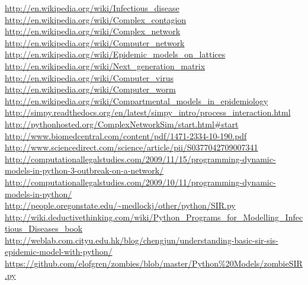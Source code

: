 \documentclass{article}
\begin{document}
\url{http://en.wikipedia.org/wiki/Infectious_disease  }\\
\url{http://en.wikipedia.org/wiki/Complex_contagion   }\\
\url{http://en.wikipedia.org/wiki/Complex_network     }\\
\url{http://en.wikipedia.org/wiki/Computer_network    }\\
\url{http://en.wikipedia.org/wiki/Epidemic_models_on_lattices}\\
\url{http://en.wikipedia.org/wiki/Next_generation_matrix}\\
\url{http://en.wikipedia.org/wiki/Computer_virus}\\
\url{http://en.wikipedia.org/wiki/Computer_worm}\\
\url{http://en.wikipedia.org/wiki/Compartmental_models_in_epidemiology}\\
\url{http://simpy.readthedocs.org/en/latest/simpy_intro/process_interaction.html}\\
\url{http://pythonhosted.org/ComplexNetworkSim/start.html#start}\\
\url{http://www.biomedcentral.com/content/pdf/1471-2334-10-190.pdf}\\
\url{http://www.sciencedirect.com/science/article/pii/S0377042709007341}\\
\url{http://computationallegalstudies.com/2009/11/15/programming-dynamic-models-in-python-3-outbreak-on-a-network/}\\
\url{http://computationallegalstudies.com/2009/10/11/programming-dynamic-models-in-python/}\\
\url{http://people.oregonstate.edu/~medlockj/other/python/SIR.py}\\
\url{http://wiki.deductivethinking.com/wiki/Python_Programs_for_Modelling_Infectious_Diseases_book}\\
\url{http://weblab.com.cityu.edu.hk/blog/chengjun/understanding-basic-sir-sis-epidemic-model-with-python/}
\url{https://github.com/elofgren/zombies/blob/master/Python%20Models/zombieSIR.py}\\
\end{document}
